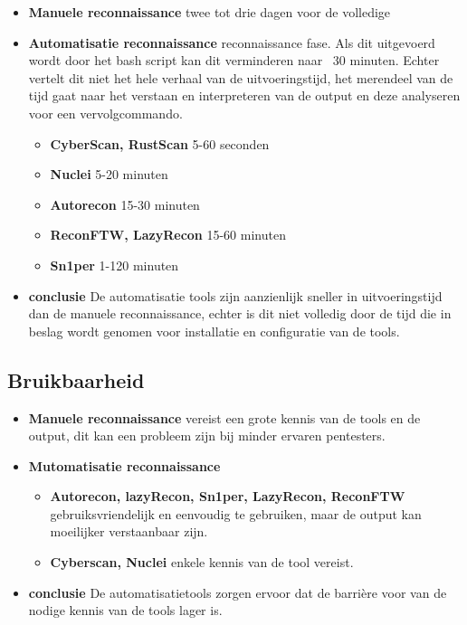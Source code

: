 \begin{itemize}
  \item \textbf{Manuele reconnaissance} twee tot drie dagen voor de volledige
  \item \textbf{Automatisatie reconnaissance} reconnaissance fase. Als dit uitgevoerd wordt door het bash script kan dit verminderen naar ~30 minuten. Echter vertelt dit niet het hele verhaal van de uitvoeringstijd, het merendeel van de tijd gaat naar het verstaan en interpreteren van de output en deze analyseren voor een vervolgcommando.
  \begin{itemize}
    \item \textbf{CyberScan, RustScan} 5-60 seconden
    \item \textbf{Nuclei} 5-20 minuten
    \item \textbf{Autorecon} 15-30 minuten
    \item \textbf{ReconFTW, LazyRecon} 15-60 minuten
    \item \textbf{Sn1per} 1-120 minuten
  \end{itemize}
  \item \textbf{conclusie} De automatisatie tools zijn aanzienlijk sneller in uitvoeringstijd dan de manuele reconnaissance, echter is dit niet volledig door de tijd die in beslag wordt genomen voor installatie en configuratie van de tools.
\end{itemize}


\subsection{Bruikbaarheid}
\begin{itemize}
  \item \textbf{Manuele reconnaissance} vereist een grote kennis van de tools en de output, dit kan een probleem zijn bij minder ervaren pentesters.
  \item \textbf{Mutomatisatie reconnaissance} 
  \begin{itemize}
    \item \textbf{Autorecon, lazyRecon, Sn1per, LazyRecon, ReconFTW} gebruiksvriendelijk en eenvoudig te gebruiken, maar de output kan moeilijker verstaanbaar zijn.
    \item \textbf{Cyberscan, Nuclei} enkele kennis van de tool vereist.
  \end{itemize}
  \item \textbf{conclusie} De automatisatietools zorgen ervoor dat de barrière voor van de nodige kennis van de tools lager is.
\end{itemize}


